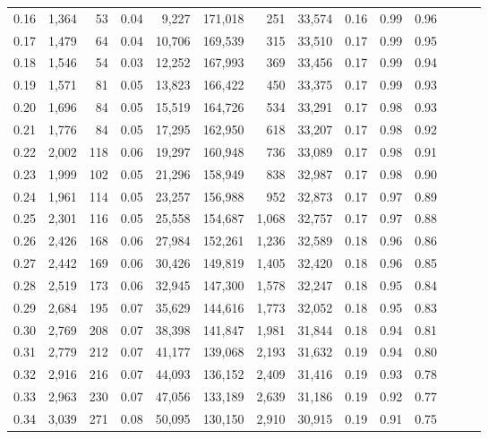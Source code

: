 \begin{tabular}{rrrrrrrrrrrrrr}
0.16 &  1,364 &   53 &  0.04 &    9,227 &  171,018 &     251 &  33,574 &  0.16 &  0.99 &      0.96 \\
0.17 &  1,479 &   64 &  0.04 &   10,706 &  169,539 &     315 &  33,510 &  0.17 &  0.99 &      0.95 \\
0.18 &  1,546 &   54 &  0.03 &   12,252 &  167,993 &     369 &  33,456 &  0.17 &  0.99 &      0.94 \\
0.19 &  1,571 &   81 &  0.05 &   13,823 &  166,422 &     450 &  33,375 &  0.17 &  0.99 &      0.93 \\
0.20 &  1,696 &   84 &  0.05 &   15,519 &  164,726 &     534 &  33,291 &  0.17 &  0.98 &      0.93 \\
0.21 &  1,776 &   84 &  0.05 &   17,295 &  162,950 &     618 &  33,207 &  0.17 &  0.98 &      0.92 \\
0.22 &  2,002 &  118 &  0.06 &   19,297 &  160,948 &     736 &  33,089 &  0.17 &  0.98 &      0.91 \\
0.23 &  1,999 &  102 &  0.05 &   21,296 &  158,949 &     838 &  32,987 &  0.17 &  0.98 &      0.90 \\
0.24 &  1,961 &  114 &  0.05 &   23,257 &  156,988 &     952 &  32,873 &  0.17 &  0.97 &      0.89 \\
0.25 &  2,301 &  116 &  0.05 &   25,558 &  154,687 &   1,068 &  32,757 &  0.17 &  0.97 &      0.88 \\
0.26 &  2,426 &  168 &  0.06 &   27,984 &  152,261 &   1,236 &  32,589 &  0.18 &  0.96 &      0.86 \\
0.27 &  2,442 &  169 &  0.06 &   30,426 &  149,819 &   1,405 &  32,420 &  0.18 &  0.96 &      0.85 \\
0.28 &  2,519 &  173 &  0.06 &   32,945 &  147,300 &   1,578 &  32,247 &  0.18 &  0.95 &      0.84 \\
0.29 &  2,684 &  195 &  0.07 &   35,629 &  144,616 &   1,773 &  32,052 &  0.18 &  0.95 &      0.83 \\
0.30 &  2,769 &  208 &  0.07 &   38,398 &  141,847 &   1,981 &  31,844 &  0.18 &  0.94 &      0.81 \\
0.31 &  2,779 &  212 &  0.07 &   41,177 &  139,068 &   2,193 &  31,632 &  0.19 &  0.94 &      0.80 \\
0.32 &  2,916 &  216 &  0.07 &   44,093 &  136,152 &   2,409 &  31,416 &  0.19 &  0.93 &      0.78 \\
0.33 &  2,963 &  230 &  0.07 &   47,056 &  133,189 &   2,639 &  31,186 &  0.19 &  0.92 &      0.77 \\
0.34 &  3,039 &  271 &  0.08 &   50,095 &  130,150 &   2,910 &  30,915 &  0.19 &  0.91 &      0.75 \\

\end{tabular}
